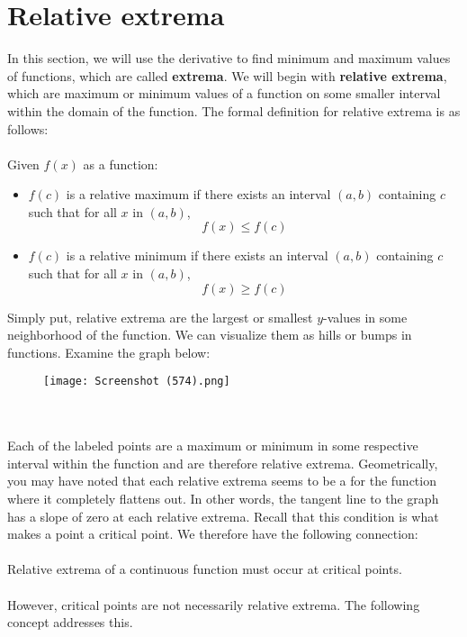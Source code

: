 \documentclass[11pt]{scrartcl}
\begin{document}
\maketitle
\noindent

\section{Relative extrema}
\noindent
In this section, we will use the derivative to find minimum and maximum values of functions, which are called \textbf{extrema}.  We will begin with \textbf{relative extrema}, which are maximum or minimum values of a function on some smaller interval within the domain of the function. The formal definition for relative extrema is as follows: \\
\\
\noindent 
Given $f(x)$ as a function: 
\begin{itemize}
    \item $f(c)$ is a relative maximum if there exists an interval $(a,b)$ containing $c$ such that for all $x$ in $(a,b)$, 
    $$f(x)\leq f(c)$$
    \item $f(c)$ is a relative minimum if there exists an interval $(a,b)$ containing $c$ such that for all $x$ in $(a,b)$, 
    $$f(x)\geq f(c)$$
\end{itemize}
\noindent 
Simply put, relative extrema are the largest or smallest $y$-values in some neighborhood of the function. We can visualize them as hills or bumps in functions. Examine the graph below: 
\begin{figure}[htp]
    \centering
    \texttt{[image: Screenshot (574).png]}
\end{figure} \\
\\
\noindent 
Each of the labeled points are a maximum or minimum in some respective interval within the function and are therefore relative extrema. Geometrically, you may have noted that each relative extrema seems to be a  for the function where it completely flattens out. In other words, the tangent line to the graph has a slope of zero at each relative extrema. Recall that this condition is what makes a point a critical point. We therefore have the following connection: \\
\\
\noindent 
Relative extrema of a continuous function must occur at critical points. \\
\\
\noindent
However, critical points are not necessarily relative extrema. The following concept addresses this. 
\end{document}
